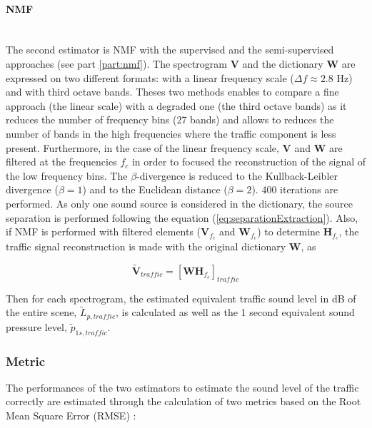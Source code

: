 \documentclass[twocolumn,a4paper,10pt]{article}
\begin{document}
\paragraph{NMF}\mbox{} \\
The second estimator is NMF with the supervised and the semi-supervised approaches (see part \ref{part:nmf}). The spectrogram $\mathbf{V}$ and the dictionary $\mathbf{W}$ are expressed on two different formats: with a linear frequency scale ($\Delta f \approx 2.8$ Hz) and with third octave bands. Theses two methods enables to compare a fine approach (the linear scale) with a degraded one (the third octave bands) as it reduces the number of frequency bins (27 bands) and allows to reduces the number of bands in the high frequencies where the traffic component is less present. Furthermore, in the case of the linear frequency scale, $\mathbf{V}$ and $\mathbf{W}$ are filtered at the frequencies $f_c$ in order to focused the reconstruction of the signal of the low frequency bins. The $\beta$-divergence is reduced to the Kullback-Leibler divergence ($\beta = 1$) and to the Euclidean distance ($\beta = 2$). 400 iterations are performed. 
As only one sound source is considered in the dictionary, the source separation is performed following the equation  (\ref{eq:separationExtraction}). Also, if NMF is performed with filtered elements ($\mathbf{V}_{f_c}$ and $\mathbf{W}_{f_c}$) to determine $\mathbf{H}_{f_c}$, the traffic signal reconstruction is made with the original dictionary $\mathbf{W}$, as 

\begin{equation}
\mathbf{\tilde{V}}_{traffic} = \left[\mathbf{WH}_{f_c}\right]_{traffic}
\end{equation}

Then for each spectrogram, the estimated equivalent traffic sound level in dB of the entire scene, $\tilde{L}_{p,traffic}$, is calculated as well as the 1 second equivalent sound pressure level, $\tilde{p}_{1s,traffic}$. 

\subsubsection{Metric}
The performances of the two estimators to estimate the sound level of the traffic correctly are estimated through the calculation of two metrics based on the Root Mean Square Error (RMSE) : 
\end{document}
